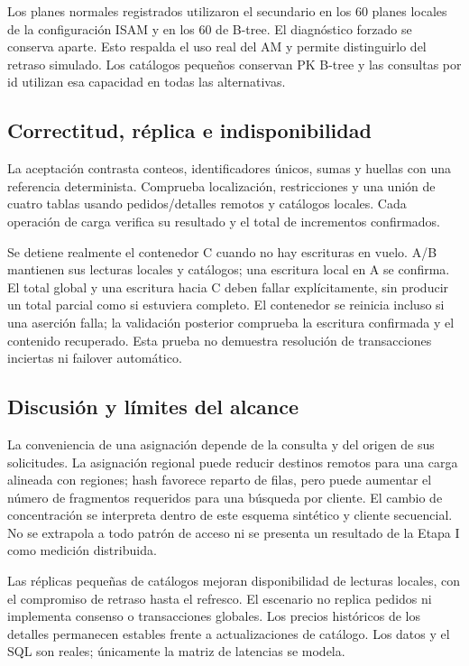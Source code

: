 \documentclass[11pt,a4paper]{article}
\begin{document}
Los planes normales registrados utilizaron el secundario en los 60 planes
locales de la configuración ISAM y en los 60 de B-tree. El diagnóstico forzado
se conserva aparte. Esto respalda el uso real del AM y permite distinguirlo del
retraso simulado. Los catálogos pequeños conservan PK B-tree y las consultas por
id utilizan esa capacidad en todas las alternativas.

\subsection{Correctitud, réplica e indisponibilidad}
La aceptación contrasta conteos, identificadores únicos, sumas y huellas con una
referencia determinista. Comprueba localización, restricciones y una unión de
cuatro tablas usando pedidos/detalles remotos y catálogos locales. Cada operación
de carga verifica su resultado y el total de incrementos confirmados.

Se detiene realmente el contenedor C cuando no hay escrituras en vuelo. A/B
mantienen sus lecturas locales y catálogos; una escritura local en A se confirma.
El total global y una escritura hacia C deben fallar explícitamente, sin
producir un total parcial como si estuviera completo. El contenedor se reinicia
incluso si una aserción falla; la validación posterior comprueba la escritura
confirmada y el contenido recuperado. Esta prueba no demuestra resolución de
transacciones inciertas ni failover automático.

\subsection{Discusión y límites del alcance}
La conveniencia de una asignación depende de la consulta y del origen de sus
solicitudes. La asignación regional puede reducir destinos remotos para una
carga alineada con regiones; hash favorece reparto de filas, pero puede aumentar
el número de fragmentos requeridos para una búsqueda por cliente. El cambio de
concentración se interpreta dentro de este esquema sintético y cliente secuencial.
No se extrapola a todo patrón de acceso ni se presenta un resultado de la
Etapa I como medición distribuida.

Las réplicas pequeñas de catálogos mejoran disponibilidad de lecturas locales,
con el compromiso de retraso hasta el refresco. El escenario no replica pedidos
ni implementa consenso o transacciones globales. Los precios históricos de los
detalles permanecen estables frente a actualizaciones de catálogo.
Los datos y el SQL son reales; únicamente la matriz de latencias se modela.
\end{document}

